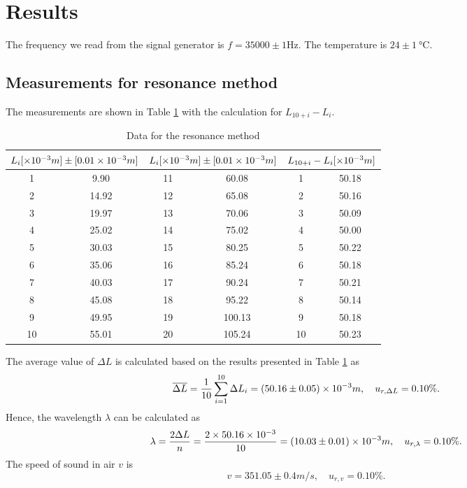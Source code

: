 \section{Results}
    The frequency we read from the signal generator is $f=35000\pm 1$Hz. The temperature is $24\pm1\SI{}{\degreeCelsius}$.
\subsection{Measurements for resonance method}
    The measurements are shown in Table \ref{data_res} with the calculation for $L_{10+i}-L_i$.
    \begin{table}[h] \small
        \centering
        \begin{tabular}{|c|c|c|c|c|c|}
        \hline
            \multicolumn{2}{|c|}{$L_i[\times10^{-3}m]\pm[0.01\times10^{-3}m]$} & 
            \multicolumn{2}{|c|}{$L_i[\times10^{-3}m]\pm[0.01\times10^{-3}m]$} &
            \multicolumn{2}{|c|}{$L_{10+i}-L_i[\times10^{-3}m]$}\\\hline
            1 & 9.90 & 11 & 60.08 & 1 & 50.18 \\\hline
            2 & 14.92 & 12 & 65.08 & 2 & 50.16 \\\hline
            3 & 19.97 & 13 & 70.06 & 3 & 50.09 \\\hline
            4 & 25.02 & 14 & 75.02 & 4 & 50.00 \\\hline
            5 & 30.03 & 15 & 80.25 & 5 & 50.22 \\\hline
            6 & 35.06 & 16 & 85.24 & 6 & 50.18 \\\hline
            7 & 40.03 & 17 & 90.24 & 7 & 50.21 \\\hline
            8 & 45.08 & 18 & 95.22 & 8 & 50.14 \\\hline
            9 & 49.95 & 19 & 100.13 & 9 & 50.18 \\\hline
            10 & 55.01 & 20 & 105.24 & 10 & 50.23 \\\hline
        \end{tabular}
        \caption{Data for the resonance method}\label{data_res}
    \end{table}
    The average value of $\Delta L$ is calculated  based on the results presented in Table \ref{data_res} as
    \[
        \overline{\Delta L}=\frac{1}{10}\sum_{i=1}^{10}\Delta L_i=(50.16\pm 0.05)\times10^{-3}m,\quad u_{r,\Delta L}=0.10\%.
    \]
    Hence, the wavelength $\lambda$ can be calculated as
    \[
        \lambda=\frac{2\Delta L}{n}=\frac{2\times50.16\times10^{-3}}{10}=(10.03\pm0.01)\times10^{-3}m,\quad u_{r,\lambda}=0.10\%.
    \]
    The speed of sound in air $v$ is
    \[
        v=351.05\pm0.4 m/s,\quad u_{r,v}=0.10\%.
    \]

